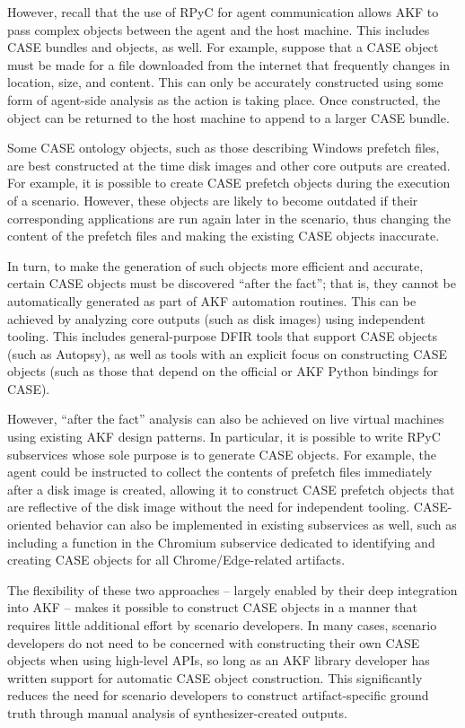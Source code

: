 \documentclass[letterpaper,12pt]{report}
\begin{document}
However, recall that the use of RPyC for agent communication allows AKF
to pass complex objects between the agent and the host machine. This
includes CASE bundles and objects, as well. For example, suppose that a
CASE object must be made for a file downloaded from the internet that
frequently changes in location, size, and content. This can only be
accurately constructed using some form of agent-side analysis as the
action is taking place. Once constructed, the object can be returned to
the host machine to append to a larger CASE bundle.

Some CASE ontology objects, such as those describing Windows prefetch
files, are best constructed at the time disk images and other core
outputs are created. For example, it is possible to create CASE prefetch
objects during the execution of a scenario. However, these objects are
likely to become outdated if their corresponding applications are run
again later in the scenario, thus changing the content of the prefetch
files and making the existing CASE objects inaccurate.

In turn, to make the generation of such objects more efficient and
accurate, certain CASE objects must be discovered ``after the fact'';
that is, they cannot be automatically generated as part of AKF
automation routines. This can be achieved by analyzing core outputs
(such as disk images) using independent tooling. This includes
general-purpose DFIR tools that support CASE objects (such as Autopsy),
as well as tools with an explicit focus on constructing CASE objects
(such as those that depend on the official or AKF Python bindings for
CASE).

However, ``after the fact'' analysis can also be achieved on live
virtual machines using existing AKF design patterns. In particular, it
is possible to write RPyC subservices whose sole purpose is to generate
CASE objects. For example, the agent could be instructed to collect the
contents of prefetch files immediately after a disk image is created,
allowing it to construct CASE prefetch objects that are reflective of
the disk image without the need for independent tooling. CASE-oriented
behavior can also be implemented in existing subservices as well, such
as including a function in the Chromium subservice dedicated to
identifying and creating CASE objects for all Chrome/Edge-related
artifacts.

The flexibility of these two approaches -- largely enabled by their deep
integration into AKF -- makes it possible to construct CASE objects in a
manner that requires little additional effort by scenario developers. In
many cases, scenario developers do not need to be concerned with
constructing their own CASE objects when using high-level APIs, so long
as an AKF library developer has written support for automatic CASE
object construction. This significantly reduces the need for scenario
developers to construct artifact-specific ground truth through manual
analysis of synthesizer-created outputs.
\end{document}
